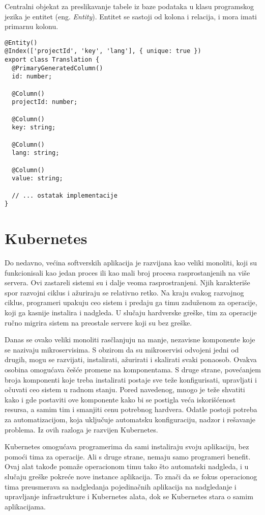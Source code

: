 Centralni objekat za preslikavanje tabele iz baze podataka u klasu programskog jezika je entitet (eng. \textit{Entity}).
Entitet se sastoji od kolona i relacija, i mora imati primarnu kolonu.

\begin{verbatim}
@Entity()
@Index(['projectId', 'key', 'lang'], { unique: true })
export class Translation {
  @PrimaryGeneratedColumn()
  id: number;
	
  @Column()
  projectId: number;
	
  @Column()
  key: string;
		
  @Column()
  lang: string;
	
  @Column()
  value: string;

  // ... ostatak implementacije
}
\end{verbatim}

\section{Kubernetes}\label{sec:kubernetes}

Do nedavno, većina softverskih aplikacija je razvijana kao veliki monoliti, koji su funkcionisali kao jedan proces 
ili kao mali broj procesa rasprostanjenih na više servera. Ovi zastareli sistemi su i dalje veoma rasprostranjeni. 
Njih karakteriše spor razvojni ciklus i ažuriraju se relativno retko. Na kraju svakog razvojnog ciklus, programeri
upakuju ceo sistem i predaju ga timu zaduženom za operacije, koji ga kasnije instalira i nadgleda. U slučaju hardverske
greške, tim za operacije ručno migrira sistem na preostale servere koji su bez greške.

Danas se ovako veliki monoliti rasčlanjuju na manje, nezavisne komponente koje se nazivaju mikroservisima. S obzirom
da su mikroservisi odvojeni jedni od drugih, mogu se razvijati, instalirati, ažurirati i skalirati svaki ponaosob.
Ovakva osobina omogućava češće promene na komponentama. S druge strane, povećanjem broja komponenti koje treba 
instalirati postaje sve teže konfigurisati, upravljati i očuvati ceo sistem u radnom stanju. Pored navedenog, mnogo 
je teže shvatiti kako i gde postaviti ove komponente kako bi se postigla veća iskorišćenost resursa, a samim tim i 
smanjiti cenu potrebnog hardvera. Odatle postoji potreba za automatizacijom, koja uključuje automatsku konfiguraciju,
nadzor  i rešavanje problema. Iz ovih razloga je razvijen Kubernetes.

Kubernetes omogućava programerima da sami instaliraju svoju aplikaciju, bez pomoći tima za operacije. Ali s druge 
strane, nemaju samo programeri benefit. Ovaj alat takođe pomaže operacionom timu tako što automatski nadgleda, 
i u slučaju greške pokreće nove instance aplikacija. To znači da se fokus operacionog tima preusmerava sa nadgledanja
pojedinačnih aplikacija na nadgledanje i upravljanje infrastrukture i Kubernetes alata, dok se Kubernetes stara o samim
aplikacijama.

